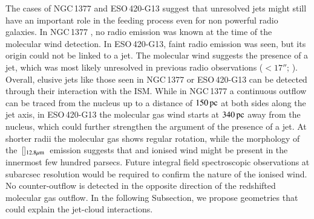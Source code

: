 \documentclass[longauth]{aa}
\newcommand{\neii}{\,\hbox{[\ion{Ne}{ii}]$_{\rm 12.8 \mu m}$}}
\begin{document}
The cases of NGC\,1377 and ESO\,420-G13 suggest that unresolved jets might still have an important role in the feeding process even for non powerful radio galaxies. In NGC\,1377 , no radio emission was known at the time of the molecular wind detection. In ESO\,420-G13, faint radio emission was seen, but its origin could not be linked to a jet. The molecular wind suggests the presence of a jet, which was most likely unresolved in previous radio observations ($< 17''$; ). Overall, elusive jets like those seen in NGC\,1377 or ESO\,420-G13 can be detected through their interaction with the ISM. While in NGC\,1377 a continuous outflow can be traced from the nucleus up to a distance of $150\, \rm{pc}$ at both sides along the jet axis, in ESO\,420-G13 the molecular gas wind starts at $340\, \rm{pc}$ away from the nucleus, which could further strengthen the argument of the presence of a jet. At shorter radii the molecular gas shows regular rotation, while the morphology of the \neii \ emission suggests that and ionised wind might be present in the innermost few hundred parsecs. Future integral field spectroscopic observations at subarcsec resolution would be required to confirm the nature of the ionised wind. No counter-outflow is detected in the opposite direction of the redshifted molecular gas outflow. In the following Subsection, we propose geometries that could explain the jet-cloud interactions. 
\end{document}
